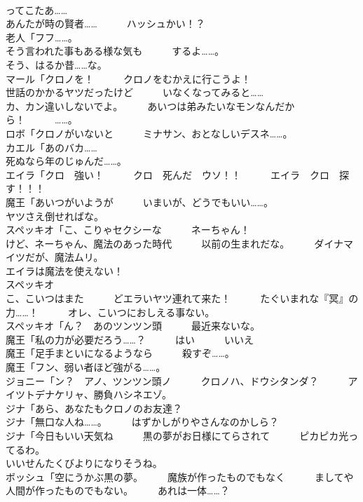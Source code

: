 \documentclass[8pt]{extreport}
\begin{document}
\begin{CJK}{UTF8}{min}
\\	ってこたあ……	
\\	あんたが時の賢者……　　　ハッシュかい！？	
\\	老人「フフ……。	
\\	そう言われた事もある様な気も　　　するよ……。	
\\	そう、はるか昔……な。	
\\	マール「クロノを！　　　クロノをむかえに行こうよ！	
\\	世話のかかるヤツだったけど　　　いなくなってみると……	
\\	カ、カン違いしないでよ。　　　あいつは弟みたいなモンなんだから！　　　……。	
\\	ロボ「クロノがいないと　　　ミナサン、おとなしいデスネ……。	
\\	カエル「あのバカ……	
\\	死ぬなら年のじゅんだ……。	
\\	エイラ「クロ　強い！　　　クロ　死んだ　ウソ！！　　　エイラ　クロ　探す！！！	
\\	魔王「あいつがいようが　　　いまいが、どうでもいい……。	
\\	ヤツさえ倒せればな。	
\\	スペッキオ「こ、こりゃセクシーな　　　ネーちゃん！	
\\	けど、ネーちゃん、魔法のあった時代　　　以前の生まれだな。　　　ダイナマイツだが、魔法ムリ。	
\\	エイラは魔法を使えない！	
\\	スペッキオ
\\	こ、こいつはまた　　　どエラいヤツ連れて来た！　　　たぐいまれな『冥』の力……！　　　オレ、こいつにおしえる事ない。	
\\	スペッキオ「ん？　あのツンツン頭　　　最近来ないな。	
\\	魔王「私の力が必要だろう……？　　　はい　　　いいえ	
\\	魔王「足手まといになるようなら　　　殺すぞ……。	
\\	魔王「フン、弱い者ほど強がる……。	
\\	ジョニー「ン？　アノ、ツンツン頭ノ　　　クロノハ、ドウシタンダ？　　　アイツトデナケリャ、勝負ハシネエゾ。	
\\	ジナ「あら、あなたもクロノのお友達？	
\\	ジナ「無口な人ね……。　　　はずかしがりやさんなのかしら？	
\\	ジナ「今日もいい天気ね　　　黒の夢がお日様にてらされて　　　ピカピカ光ってるわ。	
\\	いいせんたくびよりになりそうね。	
\\	ボッシュ「空にうかぶ黒の夢。　　　魔族が作ったものでもなく　　　ましてや人間が作ったものでもない。　　　あれは一体……？	

\end{CJK}
\end{document}
